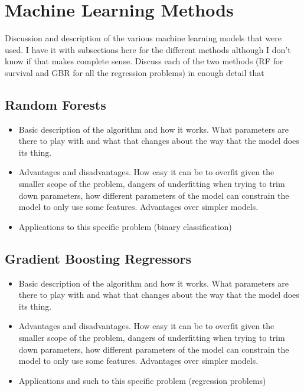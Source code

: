 \documentclass[fleqn,usenatbib]{mnras}
\begin{document}
\section{Machine Learning Methods}
Discussion and description of the various machine learning models that were used. I have it with subsections here for the different methods although I don't know if that makes complete sense. Discuss each of the two methods (RF for survival and GBR for all the regression problems) in enough detail that 

\subsection{Random Forests}
\label{sec:rf} %
\begin{itemize}
	\item Basic description of the algorithm and how it works. What parameters are there to play with and what that changes about the way that the model does its thing.
    \item Advantages and disadvantages. How easy it can be to overfit given the smaller scope of the problem, dangers of underfitting when trying to trim down parameters, how different parameters of the model can constrain the model to only use some features. Advantages over simpler models.
    \item Applications to this specific problem (binary classification)
\end{itemize}

\subsection{Gradient Boosting Regressors}
\label{sec:gbr} %
\begin{itemize}
	\item Basic description of the algorithm and how it works. What parameters are there to play with and what that changes about the way that the model does its thing.
    \item Advantages and disadvantages. How easy it can be to overfit given the smaller scope of the problem, dangers of underfitting when trying to trim down parameters, how different parameters of the model can constrain the model to only use some features. Advantages over simpler models.
    \item Applications and such to this specific problem (regression problems)
\end{itemize}
\end{document}
